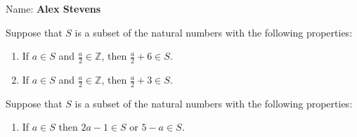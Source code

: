 \documentclass[solutions,answers]{exam}
\begin{document}
\vspace*{1em}
\noindent Name: \textbf{Alex Stevens}

\setlength\answerclearance{0.7ex}

\begin{questions}

\begin{question}
Suppose that $S$ is a subset of the natural numbers with the following properties: 
\begin{enumerate}
\item If $a\in S$ and $\frac{a}{2}\in \mathbb{Z}$, then $\frac{a}{2}+6\in S$.\\
\item If $a\in S$ and $\frac{a}{2}\in \mathbb{Z}$, then $\frac{a}{2}+3\in S$.\\
\end{enumerate}


\end{question}

\begin{question}
Suppose that $S$ is a subset of the natural numbers with the following properties: 
\begin{enumerate}
\item If $a\in S$ then $2a-1\in S$ or $5-a\in S$.\\
\end{enumerate}
\end{question}


\end{questions}
\end{document}

